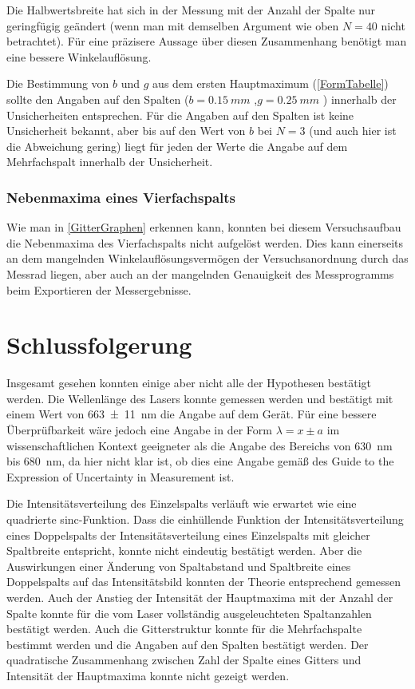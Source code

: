 \documentclass[
	a4paper,
	12pt,
	pagesize,
	ngerman
]{scrartcl}
\begin{document}
	Die Halbwertsbreite hat sich in der Messung mit der Anzahl der Spalte nur geringfügig geändert (wenn man mit demselben Argument wie oben $N=40$ nicht betrachtet).
	Für eine präzisere Aussage über diesen Zusammenhang benötigt man eine bessere Winkelauflösung.
	
	Die Bestimmung von $b $ und $g $ aus dem ersten Hauptmaximum (\cref{FormTabelle}) sollte den Angaben auf den Spalten ($b=\SI{0,15}{mm}$ ,$g=\SI{0,25}{mm}$ ) innerhalb der Unsicherheiten entsprechen.
	Für die Angaben auf den Spalten ist keine Unsicherheit bekannt, aber bis auf den Wert von $b$ bei $N=3$ (und auch hier ist die Abweichung gering) liegt für jeden der Werte die Angabe auf dem Mehrfachspalt innerhalb der Unsicherheit.
	
	\subsubsection{Nebenmaxima eines Vierfachspalts}
	Wie man in \cref{GitterGraphen} erkennen kann, konnten bei diesem Versuchsaufbau die Nebenmaxima des Vierfachspalts nicht aufgelöst werden.
	Dies kann einerseits an dem mangelnden Winkelauflösungsvermögen der Versuchsanordnung durch das Messrad liegen, aber auch an der mangelnden Genauigkeit des Messprogramms beim Exportieren der Messergebnisse.
	
	

	
	\section{Schlussfolgerung}
	Insgesamt gesehen konnten einige aber nicht alle der Hypothesen bestätigt werden.
	Die Wellenlänge des Lasers konnte gemessen werden und bestätigt mit einem Wert von \SI{663\pm 11}{nm} die Angabe auf dem Gerät.
	Für eine bessere Überprüfbarkeit wäre jedoch eine Angabe in der Form $\lambda = x\pm a$ im wissenschaftlichen Kontext geeigneter als die Angabe des Bereichs von \SI{630}{\nano \meter} bis \SI{680}{\nano \meter}, da hier nicht klar ist, ob dies eine Angabe gemäß des Guide to the Expression of Uncertainty in Measurement ist.
	
	Die Intensitätsverteilung des Einzelspalts verläuft wie erwartet wie eine quadrierte sinc-Funktion.
	Dass die einhüllende Funktion der Intensitätsverteilung eines Doppelspalts der Intensitätsverteilung eines Einzelspalts mit gleicher Spaltbreite entspricht, konnte nicht eindeutig bestätigt werden.
	Aber die Auswirkungen einer Änderung von Spaltabstand und Spaltbreite eines Doppelspalts auf das Intensitätsbild konnten der Theorie entsprechend gemessen werden.
	Auch der Anstieg der Intensität der Hauptmaxima mit der Anzahl der Spalte konnte für die vom Laser vollständig ausgeleuchteten Spaltanzahlen bestätigt werden.
	Auch die Gitterstruktur konnte für die Mehrfachspalte bestimmt werden und die Angaben auf den Spalten bestätigt werden.
	Der quadratische Zusammenhang zwischen Zahl der Spalte eines Gitters und Intensität der Hauptmaxima konnte nicht gezeigt werden.
	
\end{document}
